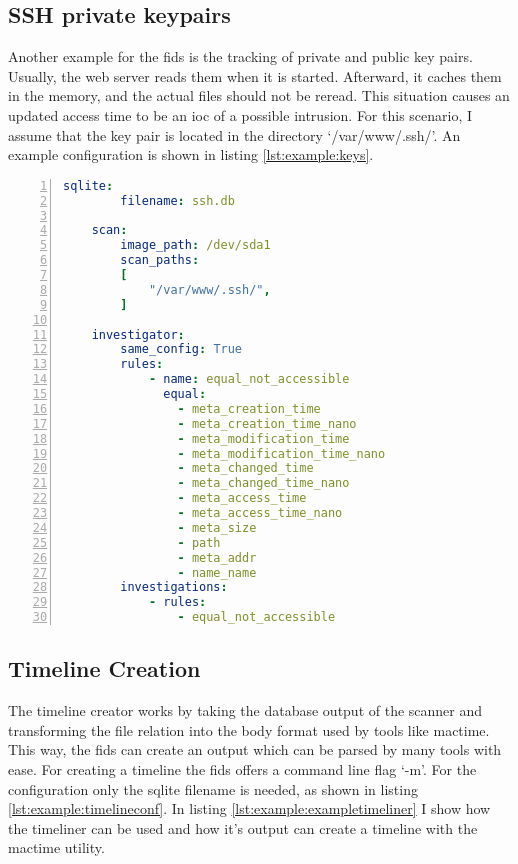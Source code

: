 \subsection{SSH private keypairs}

Another example for the \gls{fids} is the tracking of private and public key pairs. Usually, the web server reads them when it is started. Afterward, it caches them in the memory, and the actual files should not be reread. This situation causes an updated access time to be an \gls{ioc} of a possible \gls{intrusion}. For this scenario, I assume that the key pair is located in the directory `/var/www/.ssh/'. An example configuration is shown in listing \ref{lst:example:keys}.

\begin{lstlisting}[language=yaml, numbers=left, caption=Example SSH Keypair Configuration, label=lst:example:keys]
    sqlite:
        filename: ssh.db
        
    scan:
        image_path: /dev/sda1
        scan_paths: 
        [
            "/var/www/.ssh/",
        ]

    investigator:
        same_config: True
        rules: 
            - name: equal_not_accessible
              equal:
                - meta_creation_time
                - meta_creation_time_nano
                - meta_modification_time
                - meta_modification_time_nano
                - meta_changed_time
                - meta_changed_time_nano
                - meta_access_time
                - meta_access_time_nano
                - meta_size
                - path
                - meta_addr
                - name_name
        investigations:
            - rules:
                - equal_not_accessible

\end{lstlisting}

\subsection{Timeline Creation}

The timeline creator works by taking the database output of the scanner and transforming the file relation into the body format used by tools like mactime. This way, the \gls{fids} can create an output which can be parsed by many tools with ease. For creating a timeline the \gls{fids} offers a command line flag `-m'. For the configuration only the sqlite filename is needed, as shown in listing \ref{lst:example:timelineconf}. In listing \ref{lst:example:exampletimeliner} I show how the timeliner can be used and how it's output can create a timeline with the mactime utility.

